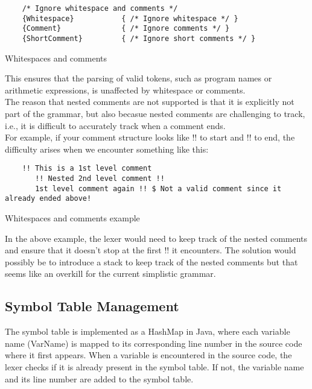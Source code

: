	\begin{verbatim}
	/* Ignore whitespace and comments */
	{Whitespace}           { /* Ignore whitespace */ }
	{Comment}              { /* Ignore comments */ }
	{ShortComment}         { /* Ignore short comments */ }
	\end{verbatim}

    \begin{table}[h]
		\centering
		\caption{Whitespaces and comments}
	\end{table}

	This ensures that the parsing of valid tokens, such as program names or arithmetic expressions, is unaffected by whitespace or comments.\\
	The reason that nested comments are not supported is that it is explicitly not part of the grammar, but also becasue nested comments are challenging to track, i.e., it
	is difficult to accurately track when a comment ends.\\

	For example, if your comment structure looks like !! to start and !! to end, the difficulty arises when we encounter something like this:

	\begin{verbatim}
	!! This is a 1st level comment
	   !! Nested 2nd level comment !!
	   1st level comment again !! $ Not a valid comment since it already ended above!
	\end{verbatim}

    \begin{table}[h]
		\centering
		\caption{Whitespaces and comments example}
	\end{table}

	In the above example, the lexer would need to keep track of the nested comments and ensure that it doesn't stop at the first !! it encounters. The solution would possibly be to
	introduce a stack to keep track of the nested comments but that seems like an overkill for the current simplistic grammar.\\

	\subsection{Symbol Table Management}

	The symbol table is implemented as a HashMap in Java, where each variable name (VarName) is mapped to its corresponding line number in the source code where it first appears.
	When a variable is encountered in the source code, the lexer checks if it is already present in the symbol table. If not, the variable name and its line number are added to the symbol table.

